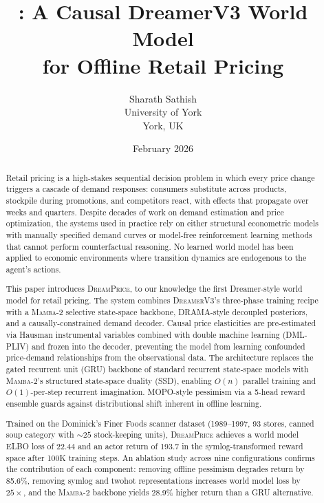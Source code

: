 \documentclass[11pt, a4paper]{article}
\title{\dreamprice{}: A Causal DreamerV3 World Model\\for Offline Retail Pricing}
\author{Sharath Sathish\\
  University of York\\
  York, UK
}
\date{February 2026}
\newcommand{\dreamprice}{\textsc{DreamPrice}}
\newcommand{\dreamer}{\textsc{DreamerV3}}
\newcommand{\mamba}{\textsc{Mamba-2}}
\begin{document}
\maketitle

\begin{abstract}
Retail pricing is a high-stakes sequential decision problem in which every price change triggers a cascade of demand responses: consumers substitute across products, stockpile during promotions, and competitors react, with effects that propagate over weeks and quarters. Despite decades of work on demand estimation and price optimization, the systems used in practice rely on either structural econometric models with manually specified demand curves or model-free reinforcement learning methods that cannot perform counterfactual reasoning. No learned world model has been applied to economic environments where transition dynamics are endogenous to the agent's actions.

This paper introduces \dreamprice{}, to our knowledge the first Dreamer-style world model for retail pricing. The system combines \dreamer{}'s three-phase training recipe with a \mamba{} selective state-space backbone, DRAMA-style decoupled posteriors, and a causally-constrained demand decoder. Causal price elasticities are pre-estimated via Hausman instrumental variables combined with double machine learning (DML-PLIV) and frozen into the decoder, preventing the model from learning confounded price-demand relationships from the observational data. The architecture replaces the gated recurrent unit (GRU) backbone of standard recurrent state-space models with \mamba{}'s structured state-space duality (SSD), enabling $O(n)$ parallel training and $O(1)$-per-step recurrent imagination. MOPO-style pessimism via a 5-head reward ensemble guards against distributional shift inherent in offline learning.

Trained on the Dominick's Finer Foods scanner dataset (1989--1997, 93 stores, canned soup category with ${\sim}25$ stock-keeping units), \dreamprice{} achieves a world model ELBO loss of 22.44 and an actor return of 193.7 in the symlog-transformed reward space after 100K training steps. An ablation study across nine configurations confirms the contribution of each component: removing offline pessimism degrades return by 85.6\%, removing symlog and twohot representations increases world model loss by $25{\times}$, and the \mamba{} backbone yields 28.9\% higher return than a GRU alternative.
\end{abstract}










\appendix

\end{document}
